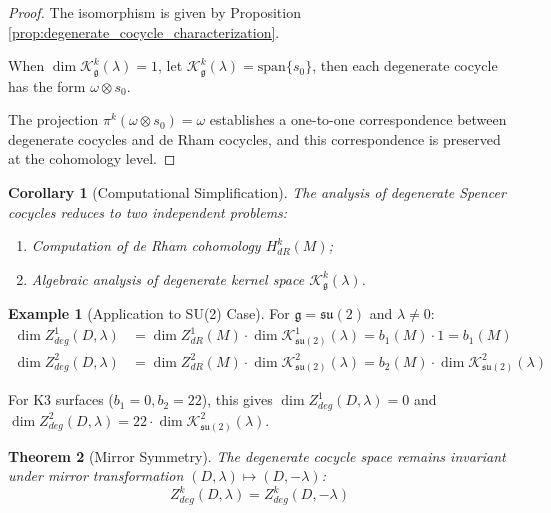 \documentclass[a4paper,12pt]{extarticle}
\theoremstyle{plain}
\newtheorem{theorem}{Theorem}[section]
\newtheorem{corollary}[theorem]{Corollary}
\theoremstyle{definition}
\newtheorem{example}{Example}[section]
\begin{document}
\begin{proof}
The isomorphism is given by Proposition \ref{prop:degenerate_cocycle_characterization}.

When $\dim \mathcal{K}_{\mathfrak{g}}^k(\lambda) = 1$, let $\mathcal{K}_{\mathfrak{g}}^k(\lambda) = \text{span}\{s_0\}$, then each degenerate cocycle has the form $\omega \otimes s_0$.

The projection $\pi^k(\omega \otimes s_0) = \omega$ establishes a one-to-one correspondence between degenerate cocycles and de Rham cocycles, and this correspondence is preserved at the cohomology level.
\end{proof}

\begin{corollary}[Computational Simplification]
\label{cor:computational_simplification}
The analysis of degenerate Spencer cocycles reduces to two independent problems:
\begin{enumerate}
    \item Computation of de Rham cohomology $H^k_{dR}(M)$;
    \item Algebraic analysis of degenerate kernel space $\mathcal{K}_{\mathfrak{g}}^k(\lambda)$.
\end{enumerate}
\end{corollary}

\begin{example}[Application to SU(2) Case]
\label{ex:su2_application}
For $\mathfrak{g} = \mathfrak{su}(2)$ and $\lambda \neq 0$:
\begin{align}
\dim Z_{deg}^1(D,\lambda) &= \dim Z^1_{dR}(M) \cdot \dim \mathcal{K}_{\mathfrak{su}(2)}^1(\lambda) = b_1(M) \cdot 1 = b_1(M)\\
\dim Z_{deg}^2(D,\lambda) &= \dim Z^2_{dR}(M) \cdot \dim \mathcal{K}_{\mathfrak{su}(2)}^2(\lambda) = b_2(M) \cdot \dim \mathcal{K}_{\mathfrak{su}(2)}^2(\lambda)
\end{align}

For K3 surfaces ($b_1 = 0, b_2 = 22$), this gives $\dim Z_{deg}^1(D,\lambda) = 0$ and $\dim Z_{deg}^2(D,\lambda) = 22 \cdot \dim \mathcal{K}_{\mathfrak{su}(2)}^2(\lambda)$.
\end{example}

\begin{theorem}[Mirror Symmetry]
\label{thm:zheng2025mirrormetry_degenerate}
The degenerate cocycle space remains invariant under mirror transformation $(D,\lambda) \mapsto (D,-\lambda)$:
$$Z_{deg}^k(D,\lambda) = Z_{deg}^k(D,-\lambda)$$
\end{theorem}
\end{document}
